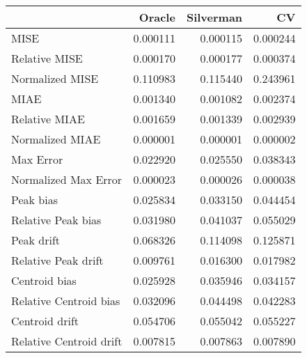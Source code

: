 \begin{tabular}{lrrr}
  \hline
 & Oracle & Silverman & CV \\ 
  \hline
MISE & 0.000111 & 0.000115 & 0.000244 \\ 
  Relative MISE & 0.000170 & 0.000177 & 0.000374 \\ 
  Normalized MISE & 0.110983 & 0.115440 & 0.243961 \\ 
  MIAE & 0.001340 & 0.001082 & 0.002374 \\ 
  Relative MIAE & 0.001659 & 0.001339 & 0.002939 \\ 
  Normalized MIAE & 0.000001 & 0.000001 & 0.000002 \\ 
  Max Error & 0.022920 & 0.025550 & 0.038343 \\ 
  Normalized Max Error & 0.000023 & 0.000026 & 0.000038 \\ 
  Peak bias & 0.025834 & 0.033150 & 0.044454 \\ 
  Relative Peak bias & 0.031980 & 0.041037 & 0.055029 \\ 
  Peak drift & 0.068326 & 0.114098 & 0.125871 \\ 
  Relative Peak drift & 0.009761 & 0.016300 & 0.017982 \\ 
  Centroid bias & 0.025928 & 0.035946 & 0.034157 \\ 
  Relative Centroid bias & 0.032096 & 0.044498 & 0.042283 \\ 
  Centroid drift & 0.054706 & 0.055042 & 0.055227 \\ 
  Relative Centroid drift & 0.007815 & 0.007863 & 0.007890 \\ 
   \hline
\end{tabular}

